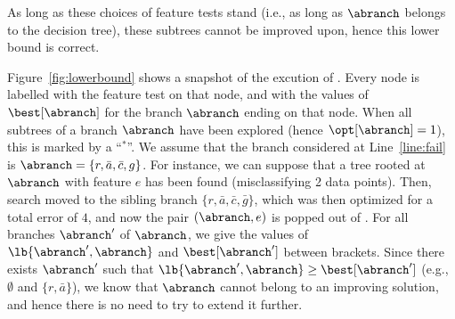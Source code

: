 \documentclass{llncs}
\begin{document}
As long as these choices of feature tests stand (i.e., as long as $\abranch$ belongs to the decision tree), these subtrees cannot be improved upon, hence this lower bound is correct.


%


\begin{example}
	\label{ex:lb}
	
	Figure~\ref{fig:lowerbound} shows a snapshot of the excution of \budalg. Every node is labelled with the feature test on that node, and with the values of $\best[\abranch]$ for the branch $\abranch$ ending on that node. When all subtrees of a branch $\abranch$ have been explored (hence $\opt[\abranch]=1$), this is marked by a ``$^*$''. We assume that the branch considered at Line~\ref{line:fail} is $\abranch = \{r, \bar{a}, \bar{c}, g\}$. For instance, we can suppose that a tree rooted at $\abranch$ with feature $e$ has been found (misclassifying 2 data points). Then, search moved to the sibling branch $\{r, \bar{a}, \bar{c}, \bar{g}\}$, which was then optimized for a total error of $4$, and now the pair $(\abranch,e)$ is popped out of \sequence. For all branches $\abranch'$ of $\abranch$, we give the values of $\lb{\abranch',\abranch}$ and $\best[\abranch']$ between brackets. Since there exists $\abranch'$ such that $\lb{\abranch',\abranch} \geq \best[\abranch']$ (e.g., $\emptyset$ and $\{r, \bar{a}\}$), we know that $\abranch$ cannot belong to an improving solution, and hence there is no need to try to extend it further. 
	



\end{example}
\end{document}
